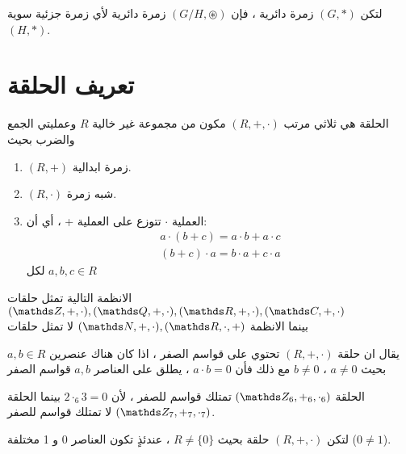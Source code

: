   \begin{theorem}
  	لتكن $(G, *)$ زمرة دائرية ، فإن $(G/H, \circledast)$ زمرة دائرية لأي زمرة جزئية سوية $(H, *)$.
  \end{theorem}
  
  
\newpage
 
 \section{تعريف الحلقة}
 
 \begin{definition}
 	الحلقة هي ثلاثي مرتب $(R, +, \cdot)$ مكون من مجموعة غير خالية $R$ وعمليتي الجمع والضرب بحيث 
 	\begin{enumerate}[label=$\boxed{\arabic*}$]
 		\item $(R, +)$ زمرة ابدالية.
 		\item  $(R, \cdot) $ شبه زمرة.
 		\item العملية $\cdot$ تتوزع على العملية + ، أي أن:
 		\begin{gather*}
 			a\cdot (b+c) = a\cdot b + a\cdot c \tag{التوزيع من اليسار}\\
 			(b + c) \cdot a = b\cdot a + c\cdot a \tag{التوزيع من اليمين}
 		\end{gather*}
 		لكل $a ,b,c\in R$
 	\end{enumerate}
 \end{definition}
 
 \begin{example}
 	الانظمة التالية تمثل حلقات
 	$
 	(\Z, + ,\cdot), (\Q, + ,\cdot),(\R, + ,\cdot),(\C, + ,\cdot)
 	$\\
 	بينما الانظمة 
 	$
 	(\N, +, \cdot), (\R, \cdot, +)
 	$
 	لا تمثل حلقات
 \end{example}
 
 \begin{definition}
 	يقال ان حلقة $(R, +, \cdot)$ تحتوي على قواسم الصفر ، اذا كان هناك عنصرين $a, b\in R$ بحيث $a\neq 0$ ، $b\neq 0$ مع ذلك فأن $a\cdot b=0$ ، يطلق على العناصر $a,b$ قواسم الصفر
 \end{definition}
 
 \begin{example}
 	الحلقة
 	$(\Z_6, +_6, \cdot_6)$ تمتلك قواسم للصفر ، لأن $2\cdot_6 3=0 $ بينما الحلقة 
 	$(\Z_7, +_7, \cdot_7)$ لا تمتلك قواسم للصفر.
 \end{example}
 
 \begin{theorem}
 	لتكن $(R, +, \cdot)$ حلقة بحيث $R\neq \{0\}$ ، عندئذٍ تكون العناصر 0 و 1 مختلفة ($0\neq 1$).
 \end{theorem}
 

